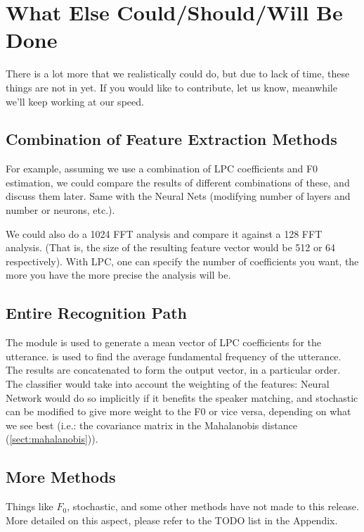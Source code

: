 \section{What Else Could/Should/Will Be Done}

There is a lot more that we realistically could do, but due to lack of time, these things
are not in yet. If you would like to contribute, let us know, meanwhile we'll keep working
at our speed.

\subsection{Combination of Feature Extraction Methods}

For example, assuming we use a combination of LPC coefficients and F0
estimation, we could compare the results of different combinations of
these, and discuss them later. Same with the
Neural Nets (modifying number of layers and number or neurons, etc.).

We could also do a 1024 FFT analysis and compare it against a 128 FFT
analysis.  (That is, the size of the resulting feature vector would be 512 or 64 respectively).
With LPC, one can specify the number of coefficients you want, the more you
have the more precise the analysis will be.

\subsection{Entire Recognition Path}

The  module is used to generate a mean vector of LPC coefficients for
the utterance.  is used to find the average fundamental frequency of the
utterance. The results are concatenated to form the output vector, in a
particular order. The classifier would take into account the weighting of
the features: Neural Network would do so implicitly if it benefits the speaker
matching, and stochastic can be modified to give more weight to the F0 or
vice versa, depending on what we see best (i.e.: the covariance matrix in the
Mahalanobis distance (\ref{sect:mahalanobis})).

\subsection{More Methods}

Things like $F_0$, stochastic, and some other methods have not made to this release.
More detailed on this aspect, please refer to the TODO list in the Appendix.

